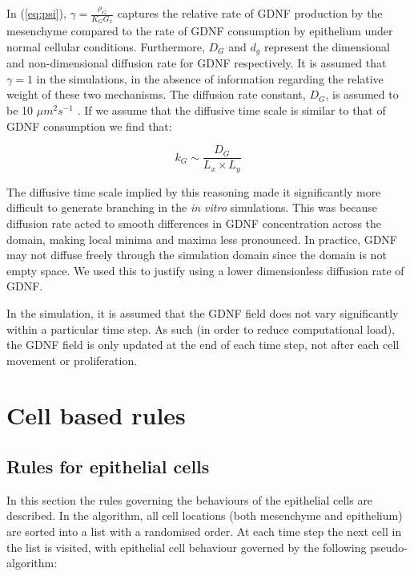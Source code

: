 \documentclass[pdftex,10pt,a4paper,twocolumn]{article}
\begin{document}
In (\ref{eq:psi}), $\gamma = \frac{\rho_G}{K_G G_x}$ captures the relative rate of GDNF production by the mesenchyme compared to the rate of GDNF consumption by epithelium under normal cellular conditions. Furthermore, $D_G$ and $d_g$ represent the dimensional and non-dimensional diffusion rate for GDNF respectively. It is assumed that $\gamma = 1$ in the simulations, in the absence of information regarding the relative weight of these two mechanisms. The diffusion rate constant, $D_G$, is assumed to be 10 $\mu m^2 s^{-1}$ \cite{MenshykauDIber}. If we assume that the diffusive time scale is similar to that of GDNF consumption we find that:

\begin{equation}\label{eq:diffusiontime}
k_G \sim \frac{D_G}{L_x \times L_y} 
\end{equation}

The diffusive time scale implied by this reasoning made it significantly more difficult to generate branching in the \textit{in vitro} simulations. This was because diffusion rate acted to smooth differences in GDNF concentration across the domain, making local minima and maxima less pronounced. In practice, GDNF may not diffuse freely through the simulation domain since the domain is not empty space. We used this to justify using a lower dimensionless diffusion rate of GDNF.

In the simulation, it is assumed that the GDNF field does not vary significantly within a particular time step. As such (in order to reduce computational load), the GDNF field is only updated at the end of each time step, not after each cell movement or proliferation.

\section{Cell based rules}\label{sec:rules}
\subsection{Rules for epithelial cells}
In this section the rules governing the behaviours of the epithelial cells are described. In the algorithm, all cell locations (both mesenchyme and epithelium) are sorted into a list with a randomised order. At each time step the next cell in the list is visited, with epithelial cell behaviour governed by the following pseudo-algorithm:
\end{document}
